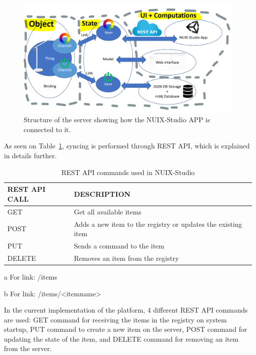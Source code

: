\begin{figure}
  \centering
  \includegraphics[width=0.9\linewidth]{figures/ExtendedServerStructure.png}
  \caption{Structure of the server showing how the NUIX-Studio APP is connected to it.}
  \label{fig:ExtendedServerStructure-figure}
\end{figure}

As seen on Table~\ref{tab:rest-api-table}, syncing is performed through REST API, which is explained in details further.

\begin{table}
  \centering
  \begin{threeparttable}[c]
    \caption{REST API commands used in NUIX-Studio}
    \label{tab:rest-api-table}
    \begin{tabular}{ll}
      \toprule
      REST API CALL    &         DESCRIPTION                 \\
      \midrule
      GET\tnote{a} & Get all available items \\
      POST\tnote{b} & Adds a new item to the registry or updates the existing item    \\
      PUT\tnote{b}        & Sends a command to the item                              \\
      DELETE\tnote{b}        & Removes an item from the registry          \\
      \bottomrule
    \end{tabular}
    \begin{tablenotes}
      \item [a] For link: /items
      \item [b] For link: /items/<itemname>
    \end{tablenotes}
  \end{threeparttable}
\end{table}

In the current implementation of the platform, 4 different REST API commands are used: GET command for receiving the items in the registry on system startup, PUT command to create a new item on the server, POST command for updating the state of the item, and DELETE command for removing an item from the server.


